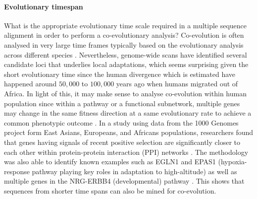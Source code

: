 \paragraph{Evolutionary timespan}
What is the appropriate evolutionary time scale required in a multiple sequence alignment in order to perform a co-evolutionary analysis?
Co-evolution is often analysed in very large time frames typically based on the evolutionary analysis across different species \cite{qian2015recent}.
Nevertheless, genome-wide scans have identified several candidate loci that underlies local adaptations, which seems surprising given the short evolutionary time since the human divergence which is estimated have happened around $50,000$ to $100,000$ years ago when humans migrated out of Africa\cite{qian2015recent}.
In light of this, it may make sense to analyse co-evolution within human population
since within a pathway or a functional subnetwork, multiple genes may change in the same fitness direction at a same evolutionary rate to achieve a common phenotypic outcome \cite{qian2015recent}.
In a study using data from the 1000 Genomes project \cite{10002012integrated} form East Asians, Europeans, and Africans populations, researchers found that genes having signals of recent positive selection are significantly closer to each other within protein-protein interaction (PPI) networks \cite{qian2015recent}.
The methodology was also able to identify known examples such as EGLN1 and EPAS1 (hypoxia-response pathway playing key roles in adaptation to high-altitude) as well as multiple genes in the NRG-ERBB4 (developmental) pathway \cite{qian2015recent}.
This shows that sequences from shorter time spans can also be mined for co-evolution.

